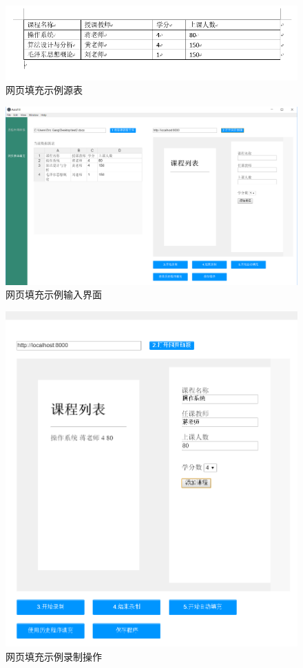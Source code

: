 \documentclass[design, pageheader]{njubachelor}
\begin{document}
\begin{figure}
    \centering
    \includegraphics[width=15cm,keepaspectratio]{figures/docx_file_2.png}
    \caption{网页填充示例源表}
    \label{fig:docx_file_2}
\end{figure}
\begin{figure}
    \centering
    \includegraphics[width=15cm,keepaspectratio]{figures/ui_2_input.png}
    \caption{网页填充示例输入界面}
    \label{fig:ui_2_input}
\end{figure}
\begin{figure}
    \centering
    \includegraphics[width=15cm,keepaspectratio]{figures/ui_2_record.png}
    \caption{网页填充示例录制操作}
    \label{fig:ui_2_record}
\end{figure}
\end{document}

